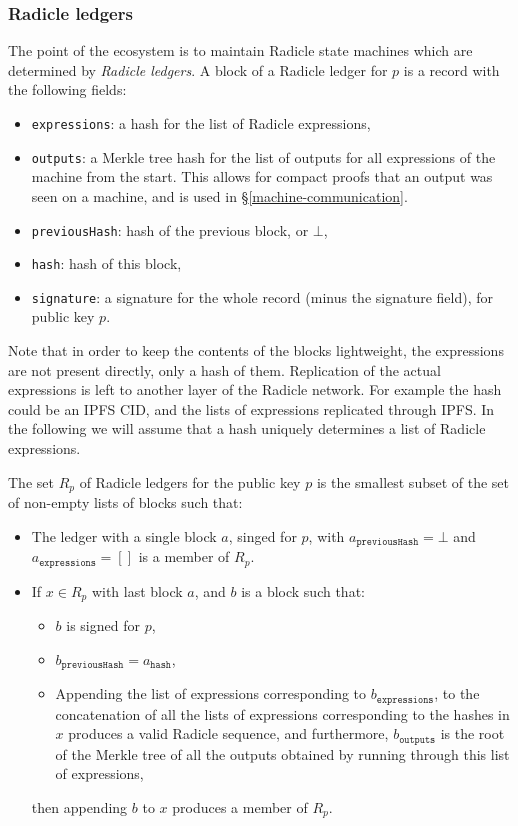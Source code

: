 \documentclass[a4paper, oneside, 10pt]{amsart}
\begin{document}
\subsubsection{Radicle ledgers}

The point of the ecosystem is to maintain Radicle state machines which are
determined by \emph{Radicle ledgers}. A block of a Radicle ledger for $p$ is a
record with the following fields:
\begin{itemize}
\item
  \texttt{expressions}: a hash for the list of Radicle expressions,
\item
  \texttt{outputs}: a Merkle tree hash for the list of outputs for all
  expressions of the machine from the start. This allows for compact proofs that
  an output was seen on a machine, and is used in \S\ref{machine-communication}.
\item
  \texttt{previousHash}: hash of the previous block, or $\bot$,
\item
  \texttt{hash}: hash of this block,
\item
  \texttt{signature}: a signature for the whole record (minus the signature
  field), for public key $p$.
\end{itemize}

Note that in order to keep the contents of the blocks lightweight, the
expressions are not present directly, only a hash of them. Replication of the
actual expressions is left to another layer of the Radicle network. For example
the hash could be an IPFS CID, and the lists of expressions replicated through
IPFS. In the following we will assume that a hash uniquely determines a list of
Radicle expressions.

The set $R_p$ of Radicle ledgers for the public key $p$ is the smallest subset
of the set of non-empty lists of blocks such that:
\begin{itemize}
\item
  The ledger with a single block $a$, singed for $p$, with
  $a_\mathtt{previousHash} = \bot$ and $a_\mathtt{expressions} = []$ is a member
  of $R_p$.
\item
  If $x \in R_p$ with last block $a$, and $b$ is a block such that:
  \begin{itemize}
  \item
    $b$ is signed for $p$,
  \item
    $b_\mathtt{previousHash} = a_\mathtt{hash}$,
  \item
    Appending the list of expressions corresponding to $b_\mathtt{expressions}$,
    to the concatenation of all the lists of expressions corresponding to the
    hashes in $x$ produces a valid Radicle sequence, and furthermore,
    $b_\mathtt{outputs}$ is the root of the Merkle tree of all the outputs
    obtained by running through this list of expressions,
  \end{itemize}
  then appending $b$ to $x$ produces a member of $R_p$.
\end{itemize}
\end{document}
